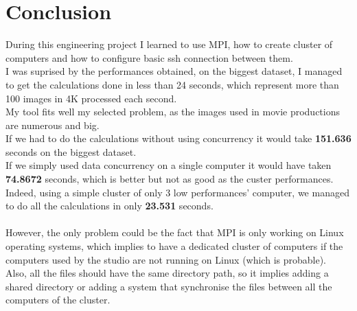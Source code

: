 \section{Conclusion}
During this engineering project I learned to use MPI, how to create cluster of computers and how to configure basic ssh connection between them.\\
I was suprised by the performances obtained, on the biggest dataset, I managed to get the calculations done in less than 24 seconds, which represent more than 100 images in 4K processed each second.\\
My tool fits well my selected problem, as the images used in movie productions are numerous and big.\\
If we had to do the calculations without using concurrency it would take \textbf{151.636} seconds on the biggest dataset.\\
If we simply used data concurrency on a single computer it would have taken \textbf{74.8672} seconds, which is better but not as good as the custer performances.\\
Indeed, using a simple cluster of only 3 low performances' computer, we managed to do all the calculations in only \textbf{23.531} seconds.\\
\\
However, the only problem could be the fact that MPI is only working on Linux operating systems, which implies to have a dedicated cluster of computers if the computers used by the studio are not running on Linux (which is probable).\\
Also, all the files should have the same directory path, so it implies adding a shared directory or adding a system that synchronise the files between all the computers of the cluster.